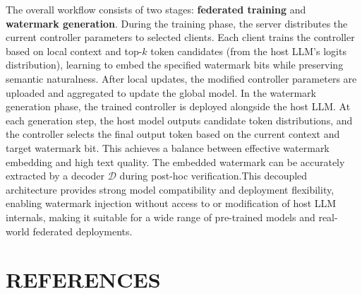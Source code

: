 \documentclass{article}
\begin{document}
 The overall workflow consists of two stages: \textbf{federated training} and \textbf{watermark generation}. During the training phase, the server distributes the current controller parameters to selected clients. Each client trains the controller based on local context and top-\(k\) token candidates (from the host LLM’s logits distribution), learning to embed the specified watermark bits while preserving semantic naturalness. After local updates, the modified controller parameters are uploaded and aggregated to update the global model. In the watermark generation phase, the trained controller is deployed alongside the host LLM. At each generation step, the host model outputs candidate token distributions, and the controller selects the final output token based on the current context and target watermark bit. This achieves a balance between effective watermark embedding and high text quality. The embedded watermark can be accurately extracted by a decoder \( \mathcal{D} \) during post-hoc verification.This decoupled architecture provides strong model compatibility and deployment flexibility, enabling watermark injection without access to or modification of host LLM internals, making it suitable for a wide range of pre-trained models and real-world federated deployments. 


\section{REFERENCES}
\label{sec:refs}



\end{document}

